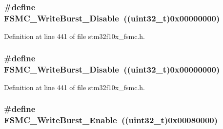 \subsubsection[{\texorpdfstring{F\+S\+M\+C\+\_\+\+Write\+Burst\+\_\+\+Disable}{FSMC_WriteBurst_Disable}}]{\setlength{\rightskip}{0pt plus 5cm}\#define F\+S\+M\+C\+\_\+\+Write\+Burst\+\_\+\+Disable~(({\bf uint32\+\_\+t})0x00000000)}\hypertarget{group___f_s_m_c___write___burst_ga65a49ecd05b3a128e8908c6a625adae7}{}\label{group___f_s_m_c___write___burst_ga65a49ecd05b3a128e8908c6a625adae7}


Definition at line 441 of file stm32f10x\+\_\+fsmc.\+h.

\subsubsection[{\texorpdfstring{F\+S\+M\+C\+\_\+\+Write\+Burst\+\_\+\+Disable}{FSMC_WriteBurst_Disable}}]{\setlength{\rightskip}{0pt plus 5cm}\#define F\+S\+M\+C\+\_\+\+Write\+Burst\+\_\+\+Disable~(({\bf uint32\+\_\+t})0x00000000)}\hypertarget{group___f_s_m_c___write___burst_ga65a49ecd05b3a128e8908c6a625adae7}{}\label{group___f_s_m_c___write___burst_ga65a49ecd05b3a128e8908c6a625adae7}


Definition at line 441 of file stm32f10x\+\_\+fsmc.\+h.

\subsubsection[{\texorpdfstring{F\+S\+M\+C\+\_\+\+Write\+Burst\+\_\+\+Enable}{FSMC_WriteBurst_Enable}}]{\setlength{\rightskip}{0pt plus 5cm}\#define F\+S\+M\+C\+\_\+\+Write\+Burst\+\_\+\+Enable~(({\bf uint32\+\_\+t})0x00080000)}\hypertarget{group___f_s_m_c___write___burst_ga1b2b66a0eb42778c2cc9a05003cf7655}{}\label{group___f_s_m_c___write___burst_ga1b2b66a0eb42778c2cc9a05003cf7655}


